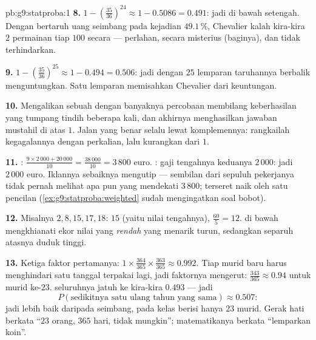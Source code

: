 \begin{solution}{pb:g9:statproba:1}
\textbf{8.} $1 - \left(\frac{35}{36}\right)^{24} \approx
1 - 0.5086 = 0.491$: jadi di bawah setengah. Dengan bertaruh uang
seimbang pada kejadian $49.1\,\%$, Chevalier kalah kira-kira $2$
permainan tiap $100$ secara  --- perlahan, secara misterius
(baginya), dan tidak terhindarkan.

\textbf{9.} $1 - \left(\frac{35}{36}\right)^{25} \approx
1 - 0.494 = 0.506$: jadi dengan $25$ lemparan taruhannya berbalik
menguntungkan. Satu lemparan memisahkan Chevalier dari keuntungan.

\textbf{10.} Mengalikan sebuah  dengan banyaknya percobaan
membilang keberhasilan yang tumpang tindih beberapa kali, dan
akhirnya menghasilkan jawaban mustahil di atas $1$. Jalan yang benar
selalu lewat komplemennya: rangkailah  kegagalannya
dengan perkalian, lalu kurangkan dari $1$.

\textbf{11.} : $\frac{9 \times 2\,000 + 20\,000}{10} =
\frac{38\,000}{10} = 3\,800$ euro. : gaji tengahnya
keduanya $2\,000$: jadi  $2\,000$ euro. Iklannya
sebaiknya mengutip  --- sembilan dari sepuluh pekerjanya
tidak pernah melihat apa pun yang mendekati $3\,800$; 
terseret naik oleh satu pencilan
(\cref{ex:g9:statproba:weighted} sudah mengingatkan soal bobot).

\textbf{12.} Misalnya $2, 8, 15, 17, 18$:  $15$
(yaitu nilai tengahnya),  $\frac{60}{5} = 12$. 
di bawah  mengkhianati ekor nilai yang \emph{rendah} yang
menarik  turun, sedangkan separuh atasnya duduk
tinggi.

\textbf{13.} Ketiga faktor pertamanya:
$1 \times \frac{364}{365} \times \frac{363}{365} \approx
0.992$. Tiap murid baru harus menghindari satu tanggal terpakai lagi,
jadi faktornya mengerut: $\frac{343}{365} \approx 0.94$ untuk murid
ke-$23$.  seluruhnya jatuh ke kira-kira $0.493$ --- jadi
\[
P(\text{sedikitnya satu ulang tahun yang sama}) \approx 0.507 :
\]
jadi lebih baik daripada seimbang, pada kelas berisi hanya $23$ murid.
Gerak hati berkata ``$23$ orang, $365$ hari, tidak mungkin'';
matematikanya berkata ``lemparkan koin''.


\end{solution}
